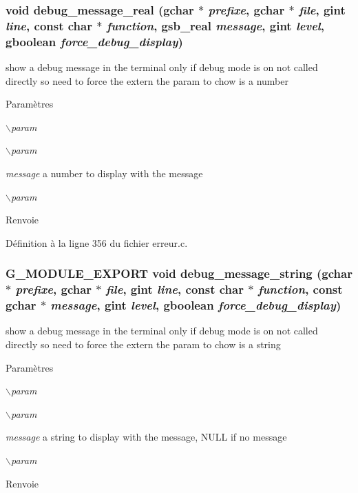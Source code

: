 \subsubsection[{debug\_\-message\_\-real}]{\setlength{\rightskip}{0pt plus 5cm}void debug\_\-message\_\-real (gchar $\ast$ {\em prefixe}, \/  gchar $\ast$ {\em file}, \/  gint {\em line}, \/  const char $\ast$ {\em function}, \/  {\bf gsb\_\-real} {\em message}, \/  gint {\em level}, \/  gboolean {\em force\_\-debug\_\-display})}\label{erreur_8h_a1d5e8e58666af6134f40c6b2469749fe}
show a debug message in the terminal only if debug mode is on not called directly so need to force the extern the param to chow is a number


\begin{DoxyParams}{Paramètres}
\item[{\em $\backslash$param}]\item[{\em $\backslash$param}]\item[{\em message}]a number to display with the message \item[{\em $\backslash$param}]\end{DoxyParams}
\begin{DoxyReturn}{Renvoie}

\end{DoxyReturn}


Définition à la ligne 356 du fichier erreur.c.

\subsubsection[{debug\_\-message\_\-string}]{\setlength{\rightskip}{0pt plus 5cm}G\_\-MODULE\_\-EXPORT void debug\_\-message\_\-string (gchar $\ast$ {\em prefixe}, \/  gchar $\ast$ {\em file}, \/  gint {\em line}, \/  const char $\ast$ {\em function}, \/  const gchar $\ast$ {\em message}, \/  gint {\em level}, \/  gboolean {\em force\_\-debug\_\-display})}\label{erreur_8h_a610481ee224a2ea98c37456084c54638}
show a debug message in the terminal only if debug mode is on not called directly so need to force the extern the param to chow is a string


\begin{DoxyParams}{Paramètres}
\item[{\em $\backslash$param}]\item[{\em $\backslash$param}]\item[{\em message}]a string to display with the message, NULL if no message \item[{\em $\backslash$param}]\end{DoxyParams}
\begin{DoxyReturn}{Renvoie}

\end{DoxyReturn}


